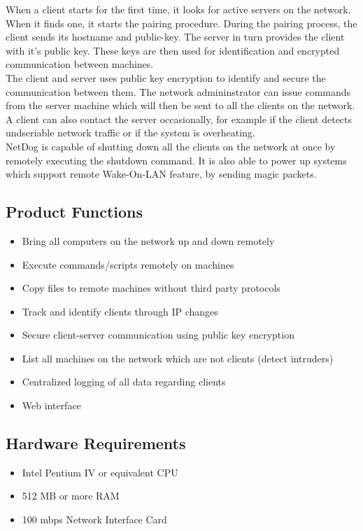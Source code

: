 When a client starts for the first time, it looks for active servers on the
network. When it finds one, it starts the pairing procedure. During the pairing
process, the client sends its hostname and public-key. The server in turn
provides the client with it's public key. These keys are then used for
identification and encrypted communication between machines.\\

The client and server uses public key encryption to identify and secure the
communication between them. The network admininstrator can issue commands from
the server machine which will then be sent to all the clients on the network.
A client can also contact the server occasionally, for example if the client
detects undseriable network traffic or if the system is overheating.\\

NetDog is capable of shutting down all the clients on the network at once by
remotely executing the shutdown command. It is also able to power up systems
which support remote Wake-On-LAN feature, by sending magic packets.\\

\subsection{Product Functions}
\begin{itemize}
    \item Bring all computers on the network up and down remotely
    \item Execute commands/scripts remotely on machines
    \item Copy files to remote machines without third party protocols
    \item Track and identify clients through IP changes
    \item Secure client-server communication using public key encryption
    \item List all machines on the network which are not clients (detect intruders)
    \item Centralized logging of all data regarding clients
    \item Web interface
\end{itemize}

\subsection{Hardware Requirements}
\begin{itemize}
    \item Intel Pentium IV or equivalent CPU
    \item 512 MB or more RAM
    \item 100 mbps Network Interface Card
\end{itemize}

